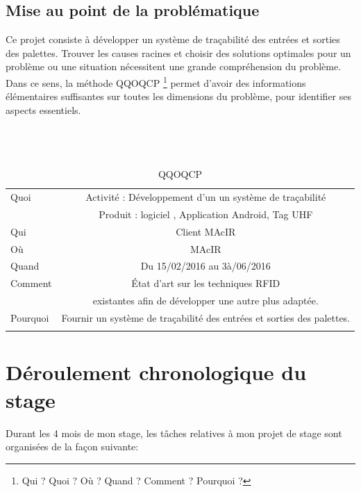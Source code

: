 \documentclass[11pt, a4paper, twoside]{book}
\begin{document}
\subsection{Mise au point de la problématique}
Ce projet consiste à développer un système de traçabilité des entrées et sorties des palettes. Trouver les causes racines et choisir des solutions optimales pour un problème ou une situation nécessitent une grande compréhension du problème. Dans ce sens, la méthode QQOQCP \footnote{Qui ? Quoi ? Où ? Quand ? Comment ?  Pourquoi ?} permet d'avoir des informations élémentaires suffisantes sur toutes les dimensions du problème, pour identifier ses aspects essentiels.\\\\\\\
        
\begin{longtable}{|l|c|}
  \hline
  Quoi & Activité : Développement d’un un système de traçabilité \\
       &  Produit : logiciel , Application Android, Tag UHF \\
  \hline
  Qui & Client MAcIR\\
  \hline
  Où & MAcIR\\
  \hline
  Quand & Du 15/02/2016 au 3à/06/2016\\
  \hline
  Comment & État d’art sur les techniques RFID \\
          &  existantes afin de développer une autre plus adaptée.\\
  \hline
  Pourquoi & Fournir un système de traçabilité des entrées et sorties des palettes.\\
  \hline
  
\caption{QQOQCP}
\end{longtable}

\section{Déroulement chronologique du stage}
Durant les 4 mois de mon stage, les tâches relatives à mon projet de stage sont organisées de la façon suivante:
\end{document}
